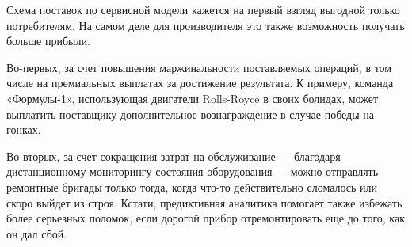     Схема поставок по сервисной модели кажется на первый взгляд выгодной только потребителям.
    На самом деле для производителя это также возможность получать больше прибыли.

    Во-первых, за счет повышения маржинальности поставляемых операций, в том числе на премиальных выплатах за достижение результата.
    К примеру, команда «Формулы-1», использующая двигатели Rolls-Royce в своих болидах, может выплатить поставщику дополнительное вознаграждение в случае победы на гонках.

    Во-вторых, за счет сокращения затрат на обслуживание — благодаря дистанционному мониторингу состояния оборудования — можно отправлять ремонтные бригады только тогда, когда что-то действительно сломалось или скоро выйдет из строя.
    Кстати, предиктивная аналитика помогает также избежать более серьезных поломок, если дорогой прибор отремонтировать еще до того, как он дал сбой.

